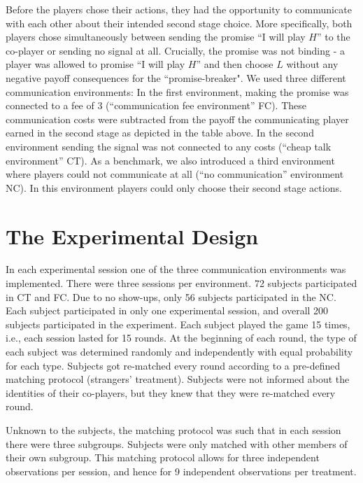 \documentclass[12pt]{article}
\theoremstyle{break}
\begin{document}
\newline
%
Before the players chose their actions, they had the opportunity to communicate with each other about their intended second stage choice. More specifically, both players chose simultaneously between sending the promise ``I will play $H$'' to the co-player or sending no signal at all. Crucially, the promise was not binding - a player was allowed to promise ``I will play $H$'' and then choose $L$ without any negative payoff consequences for the ``promise-breaker". 
We used three different communication environments: In the first environment, making the promise was connected to a fee of 3 (``communication fee environment'' FC). These communication costs were subtracted from the payoff the communicating player earned in the second stage as depicted in the table above. 
In the second environment sending the signal was not connected to any costs (``cheap talk environment'' CT).
As a benchmark, we also introduced a third environment where players could not communicate at all (``no communication'' environment NC). In this environment players could only choose their second stage actions.

\section{The Experimental Design}

In each experimental session one of the three communication environments was implemented. There were three sessions per environment. 72 subjects participated in CT and FC. Due to no show-ups, only 56 subjects participated in the NC. Each subject participated in only one experimental session, and overall 200 subjects participated in the experiment.
Each subject played the game 15 times, i.e., each session lasted for 15 rounds. At the beginning of each round, the type of each subject was determined randomly and independently with equal probability for each type. Subjects got re-matched every round according to a pre-defined matching protocol (strangers' treatment). Subjects were not informed about the identities of their co-players, but they knew that they were re-matched every round. 

Unknown to the subjects, the matching protocol was such that in each session there were three subgroups. Subjects were only matched with other members of their own subgroup. This matching protocol allows for three independent observations per session, and hence for 9 independent observations per treatment. 
\end{document}
